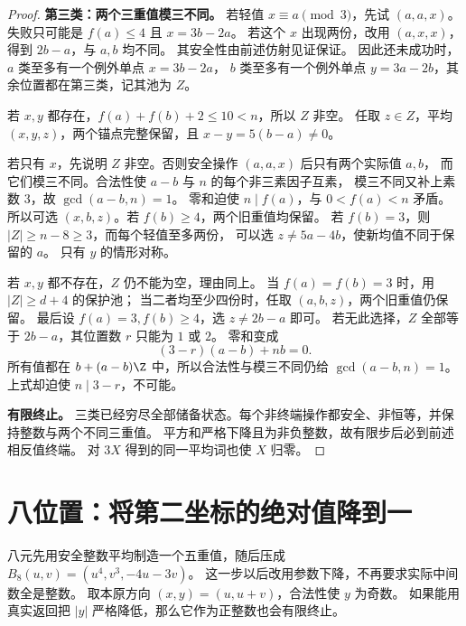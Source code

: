 \begin{proof}
\par\noindent\textbf{第三类：两个三重值模三不同。}
若轻值 $x\equiv a\pmod3$，先试 $(a,a,x)$。
失败只可能是 $f(a)\le4$ 且 $x=3b-2a$。
若这个 $x$ 出现两份，改用 $(a,x,x)$，得到 $2b-a$，与 $a,b$ 均不同。
其安全性由前述仿射见证保证。
因此还未成功时，$a$ 类至多有一个例外单点 $x=3b-2a$，
$b$ 类至多有一个例外单点 $y=3a-2b$，其余位置都在第三类，记其池为 $Z$。

若 $x,y$ 都存在，$f(a)+f(b)+2\le10<n$，所以 $Z$ 非空。
任取 $z\in Z$，平均 $(x,y,z)$，两个锚点完整保留，且 $x-y=5(b-a)\ne0$。

若只有 $x$，先说明 $Z$ 非空。否则安全操作 $(a,a,x)$ 后只有两个实际值 $a,b$，
而它们模三不同。合法性使 $a-b$ 与 $n$ 的每个非三素因子互素，
模三不同又补上素数 $3$，故 $\gcd(a-b,n)=1$。
零和迫使 $n\mid f(a)$，与 $0<f(a)<n$ 矛盾。
所以可选 $(x,b,z)$。若 $f(b)\ge4$，两个旧重值均保留。
若 $f(b)=3$，则 $|Z|\ge n-8\ge3$，而每个轻值至多两份，
可以选 $z\ne5a-4b$，使新均值不同于保留的 $a$。
只有 $y$ 的情形对称。

若 $x,y$ 都不存在，$Z$ 仍不能为空，理由同上。
当 $f(a)=f(b)=3$ 时，用 $|Z|\ge d+4$ 的保护池；
当二者均至少四份时，任取 $(a,b,z)$，两个旧重值仍保留。
最后设 $f(a)=3,f(b)\ge4$，选 $z\ne2b-a$ 即可。
若无此选择，$Z$ 全部等于 $2b-a$，其位置数 $r$ 只能为 $1$ 或 $2$。
零和变成
\[
(3-r)(a-b)+nb=0.
\]
所有值都在 $b+(a-b)\Z$ 中，所以合法性与模三不同仍给 $\gcd(a-b,n)=1$。
上式却迫使 $n\mid3-r$，不可能。

\par\noindent\textbf{有限终止。}
三类已经穷尽全部储备状态。每个非终端操作都安全、非恒等，并保持整数与两个不同三重值。
平方和严格下降且为非负整数，故有限步后必到前述相反值终端。
对 $3X$ 得到的同一平均词也使 $X$ 归零。
\end{proof}



\section{八位置：将第二坐标的绝对值降到一}
八元先用安全整数平均制造一个五重值，随后压成 $B_8(u,v)=(u^4,v^3,-4u-3v)$。
这一步以后改用参数下降，不再要求实际中间数全是整数。
取本原方向 $(x,y)=(u,u+v)$，合法性使 $y$ 为奇数。
如果能用真实返回把 $|y|$ 严格降低，那么它作为正整数也会有限终止。

